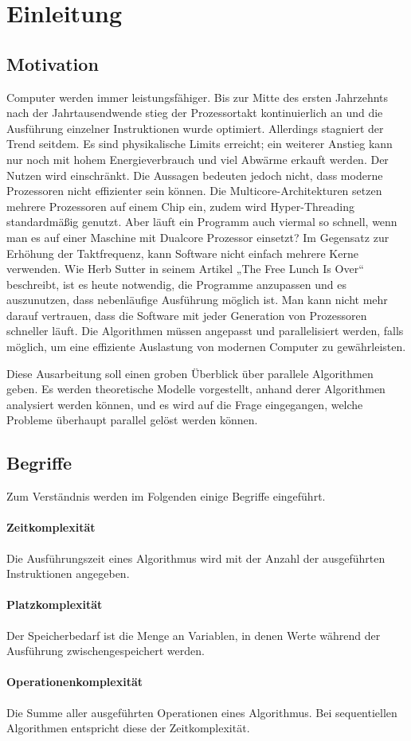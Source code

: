 \section{Einleitung}

\subsection{Motivation}
Computer werden immer leistungsfähiger.
Bis zur Mitte des ersten Jahrzehnts nach der Jahrtausendwende stieg der
Prozessortakt kontinuierlich an und die Ausführung einzelner Instruktionen
wurde optimiert.
Allerdings stagniert der Trend seitdem.
Es sind physikalische Limits erreicht; ein weiterer Anstieg kann nur noch
mit hohem Energieverbrauch und viel Abwärme erkauft werden.
Der Nutzen wird einschränkt.
Die Aussagen bedeuten jedoch nicht, dass moderne Prozessoren nicht effizienter
sein können.
Die Multicore-Architekturen setzen mehrere Prozessoren auf einem Chip ein,
zudem wird Hyper-Threading standardmäßig genutzt.
Aber läuft ein Programm auch viermal so schnell, wenn man es auf einer Maschine
mit Dualcore Prozessor einsetzt?
Im Gegensatz zur Erhöhung der Taktfrequenz, kann Software nicht einfach mehrere
Kerne verwenden.
Wie Herb Sutter in seinem Artikel „The Free Lunch Is Over“
\cite{sutterlunch} beschreibt, ist es heute notwendig, die Programme anzupassen
und es auszunutzen, dass nebenläufige Ausführung möglich ist.
Man kann nicht mehr darauf vertrauen, dass die Software mit jeder Generation
von Prozessoren schneller läuft.
Die Algorithmen müssen angepasst und parallelisiert werden, falls möglich, um
eine effiziente Auslastung von modernen Computer zu gewährleisten.

Diese Ausarbeitung soll einen groben Überblick über parallele Algorithmen geben.
Es werden theoretische Modelle vorgestellt, anhand derer Algorithmen analysiert
werden können, und es wird auf die Frage eingegangen, welche Probleme überhaupt
parallel gelöst werden können.

\subsection{Begriffe}
Zum Verständnis werden im Folgenden einige Begriffe eingeführt.

\paragraph{Zeitkomplexität}
Die Ausführungszeit eines Algorithmus wird mit der Anzahl der ausgeführten Instruktionen angegeben.

\paragraph{Platzkomplexität}
Der Speicherbedarf ist die Menge an Variablen, in denen Werte während der Ausführung zwischengespeichert werden.

\paragraph{Operationenkomplexität}
Die Summe aller ausgeführten Operationen eines Algorithmus. Bei sequentiellen Algorithmen entspricht diese der Zeitkomplexität.
